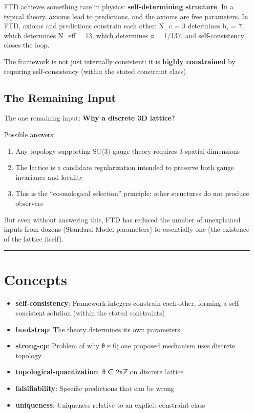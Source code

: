 \documentclass[
  11pt,
  letterpaper,
  twoside,
  openright]{book}
\providecommand{\tightlist}{%
  \setlength{\itemsep}{0pt}\setlength{\parskip}{0pt}}
\begin{document}
FTD achieves something rare in physics: \textbf{self-determining
structure}. In a typical theory, axioms lead to predictions, and the
axioms are free parameters. In FTD, axioms and predictions constrain
each other: N\_c = 3 determines b₃ = 7, which determines N\_eff = 13,
which determines α = 1/137, and self-consistency closes the loop.

The framework is not just internally consistent: it is \textbf{highly
constrained} by requiring self-consistency (within the stated constraint
class).

\subsection{The Remaining Input}\label{the-remaining-input}

The one remaining input: \textbf{Why a discrete 3D lattice?}

Possible answers:

\begin{enumerate}
\def\labelenumi{\arabic{enumi}.}
\tightlist
\item
  Any topology supporting SU(3) gauge theory requires 3 spatial
  dimensions
\item
  The lattice is a candidate regularization intended to preserve both
  gauge invariance and locality
\item
  This is the ``cosmological selection'' principle: other structures do
  not produce observers
\end{enumerate}

But even without answering this, FTD has reduced the number of
unexplained inputs from dozens (Standard Model parameters) to
essentially one (the existence of the lattice itself).

\begin{center}\rule{0.5\linewidth}{0.5pt}\end{center}

\section{Concepts}\label{concepts-45}

\begin{itemize}
\tightlist
\item
  \textbf{self-consistency}: Framework integers constrain each other,
  forming a self-consistent solution (within the stated constraints)
\item
  \textbf{bootstrap}: The theory determines its own parameters
\item
  \textbf{strong-cp}: Problem of why θ ≈ 0; one proposed mechanism uses
  discrete topology
\item
  \textbf{topological-quantization}: θ ∈ 2πℤ on discrete lattice
\item
  \textbf{falsifiability}: Specific predictions that can be wrong
\item
  \textbf{uniqueness}: Uniqueness relative to an explicit constraint
  class
\end{itemize}
\end{document}
